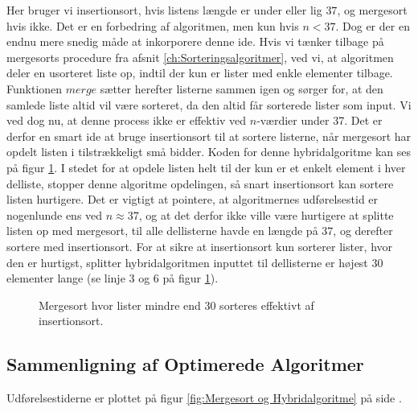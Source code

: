 Her bruger vi insertionsort, hvis listens længde er under eller lig $37$, og mergesort hvis ikke. Det er en forbedring af algoritmen, men kun hvis $n < 37$. Dog er der en endnu mere snedig måde at inkorporere denne ide. Hvis vi tænker tilbage på mergesorts procedure fra afsnit \ref{ch:Sorteringsalgoritmer}, ved vi, at algoritmen deler en usorteret liste op, indtil der kun er lister med enkle elementer tilbage. Funktionen $merge$ sætter herefter listerne sammen igen og sørger for, at den samlede liste altid vil være sorteret, da den altid får sorterede lister som input. Vi ved dog nu, at denne process ikke er effektiv ved $n$-værdier under 37. Det er derfor en smart ide at bruge insertionsort til at sortere listerne, når mergesort har opdelt listen i tilstrækkeligt små bidder. Koden for denne hybridalgoritme kan ses på figur \ref{fig:hybridalgoritme i Python}. I stedet for at opdele listen helt til der kun er et enkelt element i hver delliste, stopper denne algoritme opdelingen, så snart insertionsort kan sortere listen hurtigere. Det er vigtigt at pointere, at algoritmernes udførelsestid er nogenlunde ens ved $n \approx 37$, og at det derfor ikke ville være hurtigere at splitte listen op med mergesort, til alle dellisterne havde en længde på $37$, og derefter sortere med insertionsort. For at sikre at insertionsort kun sorterer lister, hvor den er hurtigst, splitter hybridalgoritmen inputtet til dellisterne er højest $30$ elementer lange (se linje 3 og 6 på figur \ref{fig:hybridalgoritme i Python}).



\begin{figure}
	\begin{center}
		
	\end{center}
	\caption{Mergesort hvor lister mindre end 30 sorteres effektivt af insertionsort.}
	\label{fig:hybridalgoritme i Python}
\end{figure}




\subsection{Sammenligning af Optimerede Algoritmer}%
\label{sub:Sammenligning af Optimerede Algoritmer}

Udførelsestiderne er plottet på figur \ref{fig:Mergesort og Hybridalgoritme} på side \pageref{fig:Mergesort og Hybridalgoritme}.\\

